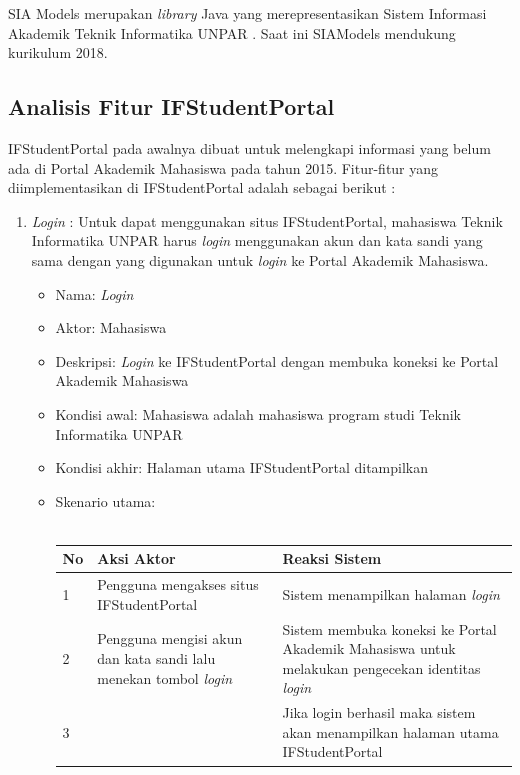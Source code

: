 SIA Models merupakan \textit{library} Java yang merepresentasikan Sistem Informasi Akademik Teknik Informatika UNPAR \cite{siamodels}. Saat ini SIAModels mendukung kurikulum 2018. 

\subsection{Analisis Fitur IFStudentPortal}
IFStudentPortal pada awalnya dibuat untuk melengkapi informasi yang belum ada di Portal Akademik Mahasiswa pada tahun 2015. Fitur-fitur yang diimplementasikan di IFStudentPortal adalah sebagai berikut : 
\begin{enumerate}
    \item \textit{Login} : 
    Untuk dapat menggunakan situs IFStudentPortal, mahasiswa Teknik Informatika UNPAR harus \textit{login} menggunakan akun dan kata sandi yang sama dengan yang digunakan untuk \textit{login} ke Portal Akademik Mahasiswa. 
    \begin{itemize}
			\item Nama: \textit{Login}
			\item Aktor: Mahasiswa
			\item Deskripsi: \textit{Login} ke IFStudentPortal dengan membuka koneksi ke Portal Akademik Mahasiswa
			\item Kondisi awal: Mahasiswa adalah mahasiswa program studi Teknik Informatika UNPAR
			\item Kondisi akhir: Halaman utama IFStudentPortal ditampilkan 
			\item Skenario utama: \\ \\
        \begin{tabular}{|p{0.5cm} |p{6cm}| p{6cm}|}
        \hline
            No & Aksi Aktor &  Reaksi Sistem \\ \hline     
            1 & Pengguna mengakses situs IFStudentPortal &  Sistem menampilkan halaman \textit{login}\\ \hline 
            2 & Pengguna mengisi akun dan kata sandi lalu menekan tombol \textit{login} & Sistem membuka koneksi ke Portal Akademik Mahasiswa untuk melakukan pengecekan identitas \textit{login} \\ \hline 
            3 & & Jika login berhasil maka sistem akan menampilkan halaman utama IFStudentPortal\\ \hline 
        \end{tabular}
    \end{itemize}
    \begin{figure}[H]

\end{figure}
\end{enumerate}
